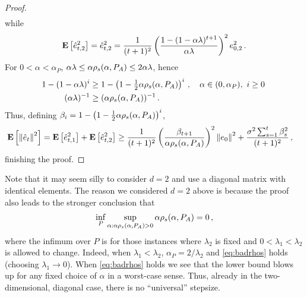 \begin{proof}
\begin{align*}
\end{align*}
while
\begin{align*}
\mathbf{E}\left[\hat{e}^2_{t,2}\right] = \hat{e}^2_{t,2} = 
\frac{1}{(t+1)^2} \left(\frac{1-(1-\alpha \lambda)^{t+1}}{ \alpha \lambda}\right)^2 e_{0,2}^2\,.
\end{align*}
For $0<\alpha<\alpha_P$, $\alpha\lambda \le \alpha \rho_s(\alpha,P_A) \le 2\alpha \lambda$, hence 
\begin{align*}
1-(1-\alpha \lambda)^i &\ge 1-\left(1-\tfrac12 \alpha \rho_s(\alpha,P_A)\right)^i\,, \quad \alpha \in (0,\alpha_P), \,\, i \ge 0\,\\
(\alpha \lambda)^{-1} &\ge  (\alpha \rho_s(\alpha,P_A))^{-1}\,.
\end{align*}
Thus, defining $\beta_i = 1-\left(1-\tfrac12 \alpha \rho_s(\alpha,P_A)\right)^i$,
\begin{align*}
\mathbf{E}\left[ \left\| \hat{e}_t\right\|^2 \right] 
& = \mathbf{E}\left[\hat{e}^2_{t,1}\right] + \mathbf{E}\left[\hat{e}^2_{t,2}\right] 
   \ge \frac{1}{(t+1)^2} 
   \left(\frac{\beta_{t+1}}{ \alpha \rho_s(\alpha,P_A)}\right)^2 \left\| e_0\right\|^2
   +
    \frac{ \sigma^2 \sum_{s=1}^t \beta_{s}^2 }{(t+1)^2}\,,
\end{align*}
finishing the proof.
\end{proof}

Note that it may seem silly to consider $d=2$ and use a diagonal matrix with identical elements.
The reason we considered $d=2$ above is because the proof also leads to the stronger conclusion
that 
\begin{align}
\inf_P \sup_{\alpha: \alpha \rho_s(\alpha,P_A)>0} \alpha \rho_s(\alpha,P_A) = 0\,,
\label{eq:badrhos}
\end{align}
where the infimum over $P$ is for those
instances where $\lambda_2$ is fixed and $0<\lambda_1<\lambda_2$ is allowed to change.
Indeed, when $\lambda_1<\lambda_2$, $\alpha_P = 2/\lambda_2$ and \eqref{eq:badrhos} holds (choosing $\lambda_1\to 0$). 
When \eqref{eq:badrhos} holds we see that the lower bound blows up for any fixed choice of $\alpha$ in a worst-case sense. Thus, already in the two-dimensional, diagonal case, there is no ``universal'' stepsize.


